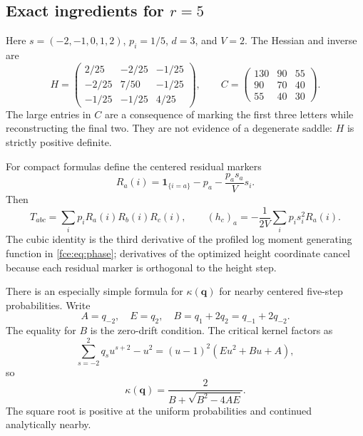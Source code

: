 \documentclass[11pt,a4paper]{article}
\numberwithin{equation}{section}
\theoremstyle{definition}\newtheorem{definition}[theorem]{Definition}
\theoremstyle{remark}\newtheorem{remark}[theorem]{Remark}
\begin{document}
\subsection{Exact ingredients for \texorpdfstring{$r=5$}{r=5}}
Here $s=(-2,-1,0,1,2)$, $p_i=1/5$, $d=3$, and $V=2$. The Hessian and
inverse are
\[
 H=\begin{pmatrix}
 2/25&-2/25&-1/25\\
 -2/25&7/50&-1/25\\
 -1/25&-1/25&4/25
 \end{pmatrix},\qquad
 C=\begin{pmatrix}
 130&90&55\\90&70&40\\55&40&30
 \end{pmatrix}.
\]
The large entries in $C$ are a consequence of marking the first three
letters while reconstructing the final two. They are not evidence of a
degenerate saddle: $H$ is strictly positive definite.

For compact formulas define the centered residual markers
\begin{equation}\label{fce:eq:residualmarkers}
 R_a(i)=\boldsymbol1_{\{i=a\}}-p_a-\frac{p_as_a}{V}s_i.
\end{equation}
Then
\begin{equation}\label{fce:eq:thirdandh}
 T_{abc}=\sum_i p_iR_a(i)R_b(i)R_c(i),\qquad
 (h_c)_a=-\frac{1}{2V}\sum_i p_i s_i^2R_a(i).
\end{equation}
The cubic identity is the third derivative of the profiled log moment
generating function in \eqref{fce:eq:phase}; derivatives of the optimized
height coordinate cancel because each residual marker is orthogonal to
the height step.

There is an especially simple formula for $\kappa(\boldsymbol q)$ for
nearby centered five-step probabilities. Write
\[
 A=q_{-2},\quad E=q_{2},\quad B=q_1+2q_2=q_{-1}+2q_{-2}.
\]
The equality for $B$ is the zero-drift condition. The critical kernel
factors as
\[
 \sum_{s=-2}^2q_su^{s+2}-u^2=(u-1)^2(Eu^2+Bu+A),
\]
so
\begin{equation}\label{fce:eq:kappafivegeneral}
 \kappa(\boldsymbol q)=\frac{2}{B+\sqrt{B^2-4AE}}.
\end{equation}
The square root is positive at the uniform probabilities and continued
analytically nearby.
\end{document}
